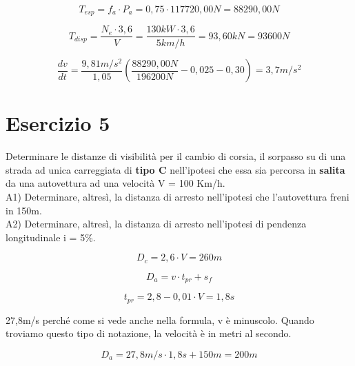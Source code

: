 \documentclass[
a4paper,
12pt, 
twoside]{scrbook}
\begin{document}
{{{{{{    \begin{equation}
    	T_{esp}=f_{a}\cdot P_{a}= 0,75\cdot 117720,00N= 88290,00N
    \end{equation}
    
    \begin{equation}
    	T_{disp}=\frac{N_e\cdot 3,6}{V}=\frac{130kW\cdot 3,6}{5km/h}=93,60kN=93600N
    \end{equation}	
    	
    \begin{equation}
    	\frac{dv}{dt}=\frac{9,81m/s^2}{1,05}(\frac{88290,00N}{196200N}-0,025-0,30)=3,7m/s^2
    \end{equation} 	
    	
    \section{Esercizio 5}	
    
    \begin{boxK}
    	Determinare le distanze di visibilità per il cambio di corsia, il sorpasso su di una strada ad unica carreggiata di \textbf{tipo C} nell'ipotesi che essa sia percorsa in \textbf{salita} da una autovettura ad una velocità V = 100 Km/h.\\
    	A1) Determinare, altresì, la distanza di arresto nell’ipotesi che l’autovettura freni in 150m. \\
    	A2) Determinare, altresì, la distanza di arresto nell’ipotesi di pendenza longitudinale i = 5\%. 
    \end{boxK}  
    
    \begin{equation}
    	D_c=2,6\cdot V=260m
    \end{equation} 	
    
    \begin{equation}
    	D_a=v\cdot t_{pr}+s_f
    \end{equation} 	
    
    \begin{equation}
    	t_{pr}=2,8-0,01\cdot V=1,8s
    \end{equation} 	
    
    \begin{boxF}
    	27,8m/s perché come si vede anche nella formula, v è minuscolo. Quando troviamo questo tipo di notazione, la velocità è in metri al secondo.
    \end{boxF}
    
    \begin{equation}
    	D_a=27,8m/s\cdot 1,8s+150m=200m
    \end{equation} 	
    
}}}}}}
\end{document}
